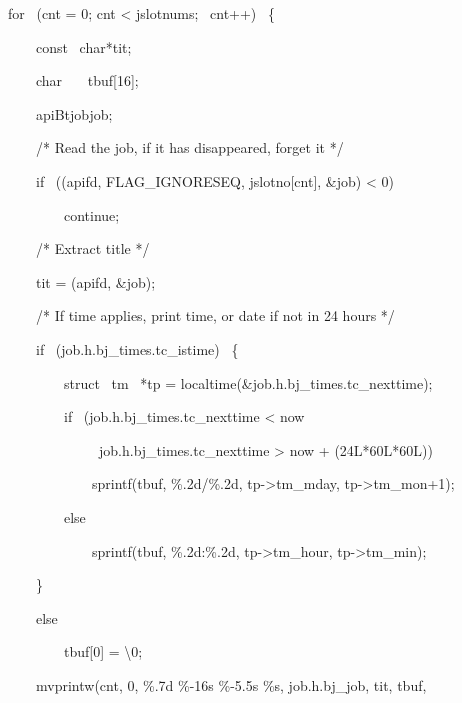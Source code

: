 \begin{exparasmall}
\ \ \ \ for \ (cnt = 0; cnt {\textless} jslotnums; \ cnt++) \ \{

\ \ \ \ \ \ \ \ const \ char*tit;

\ \ \ \ \ \ \ \ char \ \ \ tbuf[16];

\ \ \ \ \ \ \ \ apiBtjobjob;

\bigskip


\ \ \ \ \ \ \ \ /* Read the job, if it has disappeared, forget it */

\bigskip


\ \ \ \ \ \ \ \ if \ (\funcnameXBjobread{}(apifd, \constprefix{}FLAG\_IGNORESEQ,
jslotno[cnt], \&job) {\textless} 0)

\ \ \ \ \ \ \ \ \ \ \ \ continue;

\bigskip


\ \ \ \ \ \ \ \ /* Extract title */

\bigskip


\ \ \ \ \ \ \ \ tit = \funcnameXBgettitle{}(apifd, \&job);

\bigskip


\ \ \ \ \ \ \ \ /* If time applies, print time, or date if not in 24
hours */

\bigskip


\ \ \ \ \ \ \ \ if \ (job.h.bj\_times.tc\_istime) \ \{

\ \ \ \ \ \ \ \ \ \ \ \ struct \ tm \ *tp =
localtime(\&job.h.bj\_times.tc\_nexttime);

\ \ \ \ \ \ \ \ \ \ \ \ if \ (job.h.bj\_times.tc\_nexttime {\textless}
now {\textbar}{\textbar}

\ \ \ \ \ \ \ \ \ \ \ \ \ \ \ \ \ job.h.bj\_times.tc\_nexttime
{\textgreater} now + (24L*60L*60L))

\ \ \ \ \ \ \ \ \ \ \ \ \ \ \ \ sprintf(tbuf,
{\textquotedbl}\%.2d/\%.2d{\textquotedbl}, tp-{\textgreater}tm\_mday,
tp-{\textgreater}tm\_mon+1);

\ \ \ \ \ \ \ \ \ \ \ \ else

\ \ \ \ \ \ \ \ \ \ \ \ \ \ \ \ sprintf(tbuf,
{\textquotedbl}\%.2d:\%.2d{\textquotedbl}, tp-{\textgreater}tm\_hour,
tp-{\textgreater}tm\_min);

\ \ \ \ \ \ \ \ \}

\ \ \ \ \ \ \ \ else

\ \ \ \ \ \ \ \ \ \ \ \ tbuf[0] =
{\textquotesingle}{\textbackslash}0{\textquotesingle};

\ \ \ \ \ \ \ \ mvprintw(cnt, 0, {\textquotedbl}\%.7d \%-16s \%-5.5s
\%s{\textquotedbl}, job.h.bj\_job, tit, tbuf,


\end{exparasmall}
